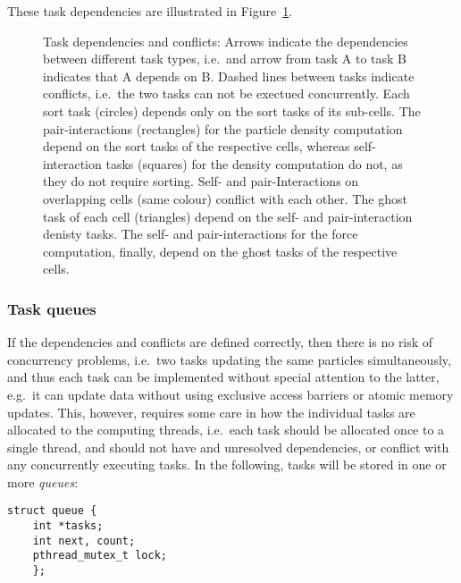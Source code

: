 \documentclass[final]{siamltex}
\newcommand{\fig}[1]
    {Figure~\ref{fig:#1}}
\begin{document}
\noindent These task dependencies are illustrated in \fig{Hierarchy2}.

\begin{figure}
    \centerline{}
    
    \caption{Task dependencies and conflicts:
        Arrows indicate the dependencies
        between different task types, i.e.~and arrow from task A to task
        B indicates that A depends on B.
        Dashed lines between tasks indicate conflicts, i.e.~the two tasks
        can not be exectued concurrently.
        Each sort task (circles) depends
        only on the sort tasks of its sub-cells.
        The pair-interactions (rectangles) for the particle
        density computation depend on the sort tasks of the respective cells,
        whereas self-interaction tasks (squares) for the density computation
        do not, as they do not require sorting.
        Self- and pair-Interactions on overlapping cells (same colour)
        conflict with each other.
        The ghost task of each cell (triangles) depend on the self-
        and pair-interaction denisty tasks.
        The self- and pair-interactions for the force computation, finally,
        depend on the ghost tasks of the respective cells.
        }
    \label{fig:Hierarchy2}
\end{figure}


\subsubsection{Task queues}

If the dependencies and conflicts are defined correctly, then
there is no risk of concurrency problems, i.e.~two tasks updating
the same particles simultaneously, and thus each task
can be implemented without special attention to the latter,
e.g.~it can update data without using exclusive access barriers
or atomic memory updates.
This, however, requires some care in how the individual tasks
are allocated to the computing threads, i.e.~each task should
be allocated once to a single thread, and should not have
and unresolved dependencies, or conflict with any concurrently
executing tasks.
In the following, tasks will be stored in one or more {\em queues}:
        
\begin{center}\begin{minipage}{0.8\textwidth}
    \begin{lstlisting}
struct queue {
    int *tasks;
    int next, count;
    pthread_mutex_t lock;
    };
    \end{lstlisting}
\end{minipage}\end{center}
\end{document}
